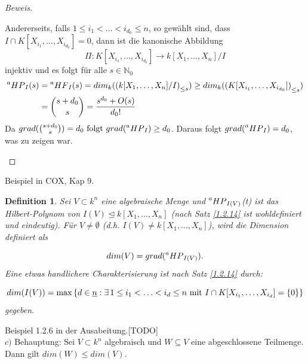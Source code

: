 \documentclass{article}
\newtheorem{definition}[satz]{Definition}
\newcommand*{\R}{k[X_{1},\ldots,X_{n}]}
\newcommand*{\indx}[2]{{#1}_{#2}}
\newcommand*{\N}{\mathbb{N}_0}
\newcommand*{\hf}[1]{$\prescript{a}{}{HF}_{#1}$}
\newcommand*{\hp}[1]{$\prescript{a}{}{HP}_{#1}$}
\begin{document}
\begin{proof}[Beweis]
\begin{compactenum}
Andererseits, falls $1\leq\indx{i}{1}<\ldots<\indx{i}{\indx{d}{0}}\leq n$, so gewählt sind, dass $I\cap K[\indx{X}{\indx{i}{1}},\ldots,\indx{X}{\indx{i}{\indx{d}{0}}}]={0}$, dann ist die kanonische Abbildung 
\begin{displaymath}
\Pi:K[\indx{X}{\indx{i}{1}},\ldots,\indx{X}{\indx{i}{\indx{d}{0}}}]\rightarrow\R/I
\end{displaymath}
injektiv und es folgt für alle $ s\in\N$
\begin{align*}
\textnormal{\hp{I}}(s)&=\textnormal{\hf{I}}(s)=\indx{dim}{k}(\indx{(\R/I)}{\leq s})\geq \indx{dim}{k}(\indx{(K[\indx{X}{\indx{i}{1}},\ldots,\indx{X}{\indx{i}{\indx{d}{0}}}])}{\leq s})\\&
=\binom{s+\indx{d}{0}}{s}=\frac{s^{\indx{d}{0}}+O(s)}{\indx{d}{0}!}
\end{align*}
Da $grad(\binom{s+\indx{d}{0}}{s})=\indx{d}{0}\textnormal{ folgt } grad(\textnormal{\hp{I}})\geq \indx{d}{0}$. Daraus folgt $grad(\textnormal{\hp{I}})=\indx{d}{0}$, was zu zeigen war. 
	\end{compactenum}
\end{proof}

Beispiel in COX, Kap 9. \\
\begin{definition}
	Sei $V\subset k^n$ eine algebraische Menge und \hp{I(V)}(t) ist das Hilbert-Polynom von $I(V)\unlhd\R$ (nach Satz \ref{1.2.14} ist wohldefiniert und eindeutig). Für $V\neq\emptyset$ (d.h. $I(V)\neq\R$), wird die Dimension definiert als 
	
\begin{displaymath}
dim(V)=grad(\textnormal{\hp{I(V)}}).
\end{displaymath}
Eine etwas handlichere Charakterisierung ist nach Satz \ref{1.2.14} durch:

\begin{displaymath}
dim(I(V))=\max{\{d\in\underline{n}:\exists{\,} 1\leq\indx{i}{1}<\ldots<\indx{i}{d}\leq n \textnormal{ mit } I\cap K[\indx{X}{\indx{i}{1}},\ldots,\indx{X}{\indx{i}{d}}]=\{0\} \}}
\end{displaymath}
gegeben.\\
\end{definition}
Beispiel 1.2.6 in der Ausabeitung.[TODO] \\

$c)$ Behauptung: Sei $V\subset k^n$ algebraisch und $W\subseteq V$ eine abgeschlossene Teilmenge. Dann gilt $dim(W)\leq dim(V)$.\\
\end{document}
